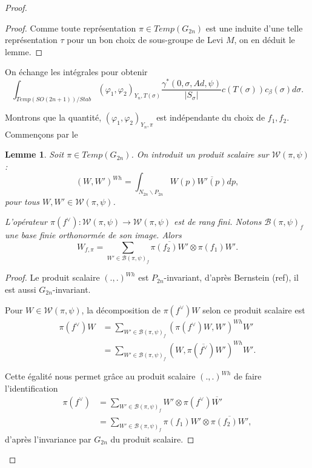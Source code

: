 \documentclass{amsart}
\newtheorem{lemme}{Lemme}[section]
\begin{document}
\begin{proof}
\begin{proof}
Comme toute représentation $\pi \in Temp(G_{2n})$ est une induite d'une telle représentation $\tau$ pour un bon choix de sous-groupe de Levi $M$, on en déduit le lemme.
\end{proof}

On échange les intégrales pour obtenir
\begin{equation}
\int_{Temp(SO(2n+1))/Stab} (\varphi_1, \varphi_2)_{Y_n, T(\sigma)} \frac{\gamma^*(0, \sigma, Ad, \psi)}{|S_\sigma|} c(T(\sigma))c_\beta(\sigma)d\sigma.
\end{equation}

Montrons que la quantité, $(\varphi_1, \varphi_2)_{Y_n, \pi}$ est indépendante du choix de $f_1, f_2$. Commençons par le
\begin{lemme}
\label{decbase}
Soit $\pi \in Temp(G_{2n})$. On introduit un produit scalaire sur $\mathcal{W}(\pi, \psi)$ :
\begin{equation}
(W, W')^{Wh} = \int_{N_{2n} \backslash P_{2n}} W(p)\overline{W'(p)} dp,
\end{equation}
pour tous $W, W' \in \mathcal{W}(\pi, \psi)$.

L'opérateur $\pi(f^{\vee}) : \mathcal{W}(\pi, \psi) \rightarrow \mathcal{W}(\pi, \psi)$ est de rang fini. Notons $\mathcal{B}(\pi, \psi)_f$ une base finie orthonormée de son image. Alors
\begin{equation}
W_{f,\pi} = \sum_{W' \in \mathcal{B}(\pi, \psi)_f} \overline{\pi(f_2)W'} \otimes \pi(f_1)W'.
\end{equation}
\end{lemme}

\begin{proof}
Le produit scalaire $(.,.)^{Wh}$ est $P_{2n}$-invariant, d'après Bernstein (ref), il est aussi $G_{2n}$-invariant.

Pour $W \in \mathcal{W}(\pi, \psi)$, la décomposition de $\pi(f^{\vee})W$ selon ce produit scalaire est
\begin{equation}
\begin{split}
\pi(f^{\vee})W &= \sum_{W' \in \mathcal{B}(\pi, \psi)_f} (\pi(f^{\vee})W, W')^{Wh}W' \\
&= \sum_{W' \in \mathcal{B}(\pi, \psi)_f} (W, \pi(\overline{f^{\vee}})W')^{Wh}W'.
\end{split}
\end{equation}

Cette égalité nous permet grâce au produit scalaire $(.,.)^{Wh}$ de faire l'identification
\begin{equation}
\begin{split}
\pi(f^\vee) &= \sum_{W' \in \mathcal{B}(\pi, \psi)_f} W' \otimes \pi(f^\vee)\overline{W'} \\
&= \sum_{W' \in \mathcal{B}(\pi, \psi)_f} \pi(f_1)W' \otimes \overline{\pi(f_2)W'},
\end{split}
\end{equation}
d'après l'invariance par $G_{2n}$ du produit scalaire.


\end{proof}
\end{proof}
\end{document}
